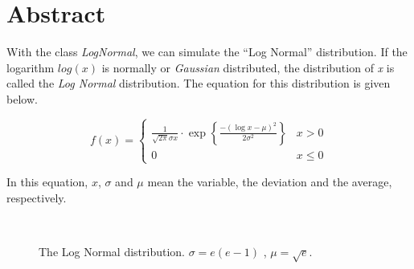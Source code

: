 %

\section{Abstract}

\noindent
With the class {\em LogNormal}, we can simulate the ``Log Normal''
distribution. If the logarithm $log(x)$ is normally or {\em Gaussian}
distributed, the distribution of {\em x} is called the {\em Log
Normal} distribution. The equation for this distribution is given below.

\begin{equation}
f(x) = \left\{
\begin{array}{ll}
\frac{1}{\sqrt{2\pi} \sigma x} \cdot \exp \left\{ \frac{-(\log x - \mu )^2}{2 \sigma^2} \right\} & x>0 \\
0 & x \le 0
\end{array}
\right.
\end{equation}

\noindent
In this equation, $x$, $\sigma$ and $\mu$ mean the variable, the
deviation and the average, respectively.

\vspace*{10mm}

\begin{center}
\begin{figure}[h]
\\
\caption{The Log Normal distribution. $\sigma=e(e-1)$ , $\mu=\sqrt{e}$.}
\end{figure}
\end{center}

